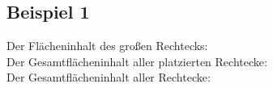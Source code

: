 \subsection{Beispiel 1}\label{ex:1}
Der Flächeninhalt des großen Rechtecks: \\
Der Gesamtflächeninhalt aller platzierten Rechtecke: \\
Der Gesamtflächeninhalt aller Rechtecke: 